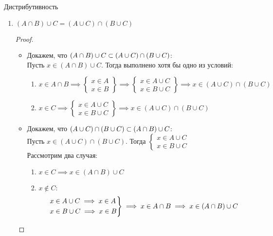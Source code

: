 \begin{props}
	\item Дистрибутивность
	\begin{enumerate}
		\item $(A \cap B) \cup C = (A \cup C) \cap (B \cup C)$
		\begin{proof}
			\hfill
			\begin{itemize}
				\item Докажем, что $(A \cap B) \cup C \subset (A \cup C) \cap (B \cup C)$: \\
				Пусть $x \in (A \cap B) \cup C$. Тогда выполнено хотя бы одно из условий:
				\begin{enumerate}
					\item $x \in A \cap B \implies
					\begin{Bmatrix}
					   	x \in A \\
						x \in B
					\end{Bmatrix} \implies
					\begin{Bmatrix}
					   	x \in A \cup C \\
						x \in B \cup C
					\end{Bmatrix} \implies x \in (A \cup C) \cap (B \cup C) $
					\item $ x \in C \implies
					\begin{Bmatrix}
						x \in A \cup C \\
						x \in B \cup C
					\end{Bmatrix} \implies x \in (A \cup C) \cap (B \cup C) $
				\end{enumerate}
				\item Докажем, что $(A \cup C) \cap (B \cup C) \subset (A \cap B) \cup C$: \\
				Пусть $x \in (A \cup C) \cap (B \cup C)$. Тогда $
				\begin{cases}
					x \in A \cup C \\
					x \in B \cup C
				\end{cases}$ \\
				Рассмотрим два случая:
				\begin{enumerate}
					\item $x \in C \implies x \in (A \cap B) \cup C$
					\item $x \notin C$:
					$$ \begin{rcases}
						x \in A \cup C \implies x \in A \\
						x \in B \cup C \implies x \in B
					   \end{rcases} \implies x \in A \cap B \implies x \in (A \cap B) \cup C $$

\end{enumerate}
\end{itemize}
\end{proof}
\end{enumerate}
\end{props}
